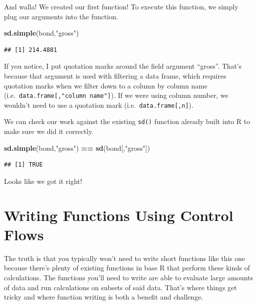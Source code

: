 \documentclass[
]{book}
\newenvironment{Shaded}{\begin{snugshade}}{\end{snugshade}}
\newcommand{\KeywordTok}[1]{\textcolor[rgb]{0.13,0.29,0.53}{\textbf{#1}}}
\newcommand{\NormalTok}[1]{#1}
\newcommand{\OperatorTok}[1]{\textcolor[rgb]{0.81,0.36,0.00}{\textbf{#1}}}
\newcommand{\StringTok}[1]{\textcolor[rgb]{0.31,0.60,0.02}{#1}}
\begin{document}
\begin{center}
And walla! We created our first function! To execute this function, we simply plug our arguments into the function.

\begin{Shaded}
\begin{Highlighting}[]
\KeywordTok{sd.simple}\NormalTok{(bond,}\StringTok{"gross"}\NormalTok{)}
\end{Highlighting}
\end{Shaded}

\begin{verbatim}
## [1] 214.4881
\end{verbatim}

If you notice, I put quotation marks around the field argument ``gross''. That's because that argument is used with filtering a data frame, which requires quotation marks when we filter down to a column by column name (i.e.~\texttt{data.frame{[},"column\ name"{]}}). If we were using column number, we wouldn't need to use a quotation mark (i.e.~\texttt{data.frame{[},n{]}}).

We can check our work against the existing \texttt{sd()} function already built into R to make sure we did it correctly.

\begin{Shaded}
\begin{Highlighting}[]
\KeywordTok{sd.simple}\NormalTok{(bond,}\StringTok{"gross"}\NormalTok{) }\OperatorTok{==}\StringTok{ }\KeywordTok{sd}\NormalTok{(bond[,}\StringTok{"gross"}\NormalTok{])}
\end{Highlighting}
\end{Shaded}

\begin{verbatim}
## [1] TRUE
\end{verbatim}

Looks like we got it right!

\hypertarget{writing-functions-using-control-flows}{%
\section{Writing Functions Using Control Flows}\label{writing-functions-using-control-flows}}

The truth is that you typically won't need to write short functions like this one because there's plenty of existing functions in base R that perform these kinds of calculations. The functions you'll need to write are able to evaluate large amounts of data and run calculations on subsets of said data. That's where things get tricky and where function writing is both a benefit and challenge.


\end{center}
\end{document}
